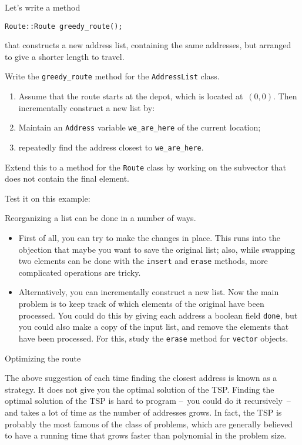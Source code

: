 Let's write a method
\begin{lstlisting}
Route::Route greedy_route();
\end{lstlisting}
that constructs a new address list, containing the same addresses, but
arranged to give a shorter length to travel.

\begin{exercise}
  Write the \lstinline{greedy_route} method for the
  \lstinline{AddressList} class.
  \begin{enumerate}
  \item Assume that the route starts at the depot, which is located
    at~$(0,0)$. Then  incrementally construct a new list by:
    \item Maintain an \lstinline{Address} variable
      \lstinline{we_are_here} of the current location;
    \item repeatedly find the address closest to \lstinline{we_are_here}.
  \end{enumerate}
  Extend this to a method for the
  \lstinline{Route} class by working on the subvector that does not
  contain the final element.

  Test it on this example:
\end{exercise}

Reorganizing a list can be done in a number of ways.
\begin{itemize}
\item First of all, you can try to make the changes in place. This
  runs into the objection that maybe you want to save the original
  list; also, while swapping two elements can be done with the
  \lstinline{insert} and \lstinline{erase} methods, more complicated
  operations are tricky.
\item Alternatively, you can incrementally construct a new list. Now
  the main problem is to keep track of which elements of the original
  have been processed. You could do this by giving each address a
  boolean field \lstinline{done}, but you could also make a copy of
  the input list, and remove the elements that have been processed.
  For this, study the \lstinline{erase} method for \lstinline{vector} objects.
\end{itemize}

 {Optimizing the route}

The above suggestion of each time finding the closest address is known
as a  strategy. It does not give you
the optimal solution of the \ac{TSP}. Finding the optimal solution of
the \ac{TSP} is hard to program --~you could do it recursively~-- and
takes a lot of time as the number of addresses grows. In fact, the
\ac{TSP} is probably the most famous of the class of
 problems, which are generally believed to have a
running time that grows faster than polynomial in the problem size.


